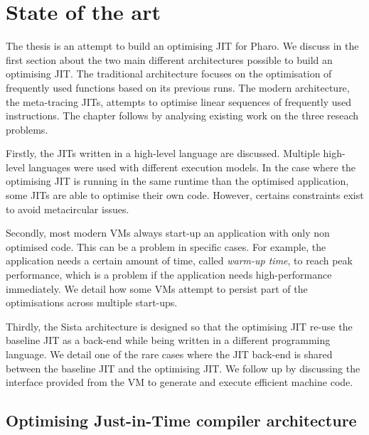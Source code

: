 \documentclass[a4paper,12pt,twoside]{../includes/ThesisStyle}
\begin{document}
\fi

\chapter{State of the art}
\label{chap:stateOfTheArt}
\minitoc

The thesis is an attempt to build an optimising JIT for Pharo. We discuss in the first section about the two main different architectures possible to build an optimising JIT. The traditional architecture focuses on the optimisation of frequently used functions based on its previous runs. The modern architecture, the meta-tracing JITs, attempts to optimise linear sequences of frequently used instructions. The chapter follows by analysing existing work on the three reseach problems.

Firstly, the JITs written in a high-level language are discussed. Multiple high-level languages were used with different execution models. In the case where the optimising JIT is running in the same runtime than the optimised application, some JITs are able to optimise their own code. However, certains constraints exist to avoid metacircular issues.

Secondly, most modern VMs always start-up an application with only non optimised code. This can be a problem in specific cases. For example, the application needs a certain amount of time, called \emph{warm-up time}, to reach peak performance, which is a problem if the application needs high-performance immediately. We detail how some VMs attempt to persist part of the optimisations across multiple start-ups.

Thirdly, the Sista architecture is designed so that the optimising JIT re-use the baseline JIT as a back-end while being written in a different programming language. We detail one of the rare cases where the JIT back-end is shared between the baseline JIT and the optimising JIT. We follow up by discussing the interface provided from the VM to generate and execute efficient machine code.


\section{Optimising Just-in-Time compiler architecture}
\end{document}
